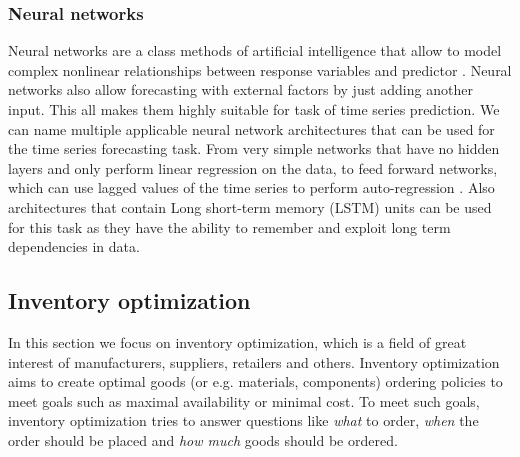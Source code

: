 \documentclass[11pt,a4paper]{article}
\begin{document}
\subsubsection{Neural networks}
Neural networks are a class methods of artificial intelligence that allow to model complex nonlinear relationships between response variables and predictor \cite{hyndman2014forecasting}. Neural networks also allow forecasting with external factors by just adding another input. This all makes them highly suitable for task of time series prediction. We can name multiple applicable neural network architectures that can be used for the time series forecasting task. From very simple networks that have no hidden layers and only perform linear regression on the data, to feed forward networks, which can use lagged values of the time series to perform auto-regression \cite{hyndman2014forecasting}. Also architectures that contain Long short-term memory (LSTM) units can be used for this task  \cite{laptev2017time} as they have the ability to remember and exploit long term dependencies in data.

\newpage
\subsection{Inventory optimization}
\label{sec:inopt_theory}
In this section we focus on inventory optimization, which is a field of great interest of manufacturers, suppliers, retailers and others.
Inventory optimization aims to create optimal goods (or e.g. materials, components) ordering policies to meet goals such as maximal availability or minimal cost. To meet such goals, inventory optimization tries to answer questions like \textit{what} to order, \textit{when} the order should be placed and \textit{how much} goods should be ordered.
\end{document}

